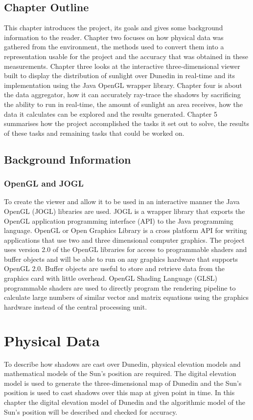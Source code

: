 \documentclass[12pt]{report}
\begin{document}
\section{Chapter Outline}
This chapter introduces the project, its goals and gives some background information to the reader. Chapter two focuses on how physical data was gathered from the environment, the methods used to convert them into a representation usable for the project and the accuracy that was obtained in these measurements. Chapter three looks at the interactive three-dimensional viewer built to display the distribution of sunlight over Dunedin in real-time and its implementation using the Java OpenGL wrapper library\cite{JOGL}. Chapter four is about the data aggregator, how it can accurately ray-trace the shadows by sacrificing the ability to run in real-time, the amount of sunlight an area receives, how the data it calculates can be explored and the results generated. Chapter 5 summarises how the project accomplished the tasks it set out to solve, the results of these tasks and remaining tasks that could be worked on.

\section{Background Information}
\subsection{OpenGL and JOGL} 
To create the viewer and allow it to be used in an interactive manner the Java OpenGL (JOGL)\cite{JOGL} libraries are used. JOGL is a wrapper library that exports the OpenGL application programming interface (API) to the Java programming language. OpenGL or Open Graphics Library is a cross platform API for writing applications that use two and three dimensional computer graphics. The project uses version 2.0 of the OpenGL libraries for access to programmable shaders and buffer objects and will be able to run on any graphics hardware that supports OpenGL 2.0. Buffer objects are useful to store and retrieve data from the graphics card with little overhead.
OpenGL Shading Language (GLSL) programmable shaders are used to directly program the rendering pipeline to calculate large numbers of similar vector and matrix equations using the graphics hardware instead of the central processing unit.


\chapter{Physical Data}
To describe how shadows are cast over Dunedin, physical elevation models and mathematical models of the Sun's position are required. The digital elevation model is used to generate the three-dimensional map of Dunedin and the Sun's position is used to cast shadows over this map at given point in time. In this chapter the digital elevation model of Dunedin and the algorithmic model of the Sun's position will be described and checked for accuracy.
\end{document}
